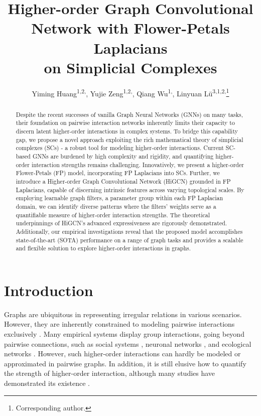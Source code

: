 \documentclass[letterpaper]{article} \usepackage{aaai24}
\title{Higher-order Graph Convolutional Network with Flower-Petals Laplacians \\on Simplicial Complexes}
\author{
Yiming Huang\textsuperscript{\rm 1,2,}\equalcontrib,
Yujie Zeng\textsuperscript{\rm 1,2,}\equalcontrib,
Qiang Wu\textsuperscript{{\rm 1},\textdagger},
Linyuan L{\"u}\textsuperscript{\rm 3,1,2,}\thanks{Corresponding author.}
}
\theoremstyle{plain}
\theoremstyle{definition}
\theoremstyle{remark}
\begin{document}
\maketitle

\begin{abstract}
Despite the recent successes of vanilla Graph Neural Networks (GNNs) on many tasks, their foundation on pairwise interaction networks inherently limits their capacity to discern latent higher-order interactions in complex systems.
To bridge this capability gap, we propose a novel approach exploiting the rich mathematical theory of simplicial complexes (SCs) - a robust tool for modeling higher-order interactions.
Current SC-based GNNs are burdened by high complexity and rigidity, and quantifying higher-order interaction strengths remains challenging.
Innovatively, we present a higher-order Flower-Petals (FP) model, incorporating FP Laplacians into SCs. Further, we introduce a Higher-order Graph Convolutional Network (HiGCN) grounded in FP Laplacians, capable of discerning intrinsic features across varying topological scales.
By employing learnable graph filters, a parameter group within each FP Laplacian domain, we can identify diverse patterns where the filters' weights serve as a quantifiable measure of higher-order interaction strengths.
The theoretical underpinnings of HiGCN's advanced expressiveness are rigorously demonstrated. Additionally, our empirical investigations reveal that the proposed model accomplishes state-of-the-art (SOTA) performance on a range of graph tasks and provides a scalable and flexible solution to explore higher-order interactions in graphs.
\end{abstract}

\section{Introduction}
Graphs are ubiquitous in representing irregular relations in various scenarios. 
However, they are inherently constrained to modeling pairwise interactions exclusively \cite{HigherOrderReview2020}.
Many empirical systems display group interactions, going beyond pairwise connections, such as social systems \cite{SocialNet2010}, neuronal networks \cite{BrainNet2011}, and ecological networks \cite{Ecology2017}.
However, such higher-order interactions can hardly be modeled or approximated in pairwise graphs.
In addition, it is still elusive how to quantify the strength of higher-order interaction, although many studies have demonstrated its existence \cite{battiston2021physics}.
\end{document}
